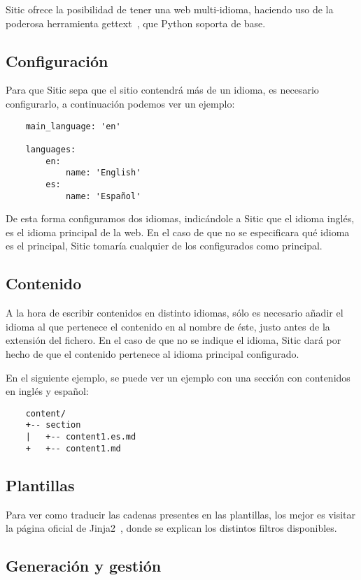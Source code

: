 Sitic ofrece la posibilidad de tener una web multi-idioma, haciendo uso de la poderosa herramienta
gettext~\cite{gettext}, que Python soporta de base.

\subsection{Configuración}

Para que Sitic sepa que el sitio contendrá más de un idioma, es necesario configurarlo, a continuación
podemos ver un ejemplo:

\begin{verbatim}
    main_language: 'en'

    languages:
        en:
            name: 'English'
        es:
            name: 'Español'
\end{verbatim}

De esta forma configuramos dos idiomas, indicándole a Sitic que el idioma inglés, es el idioma principal
de la web. En el caso de que no se especificara qué idioma es el principal, Sitic tomaría cualquier de
los configurados como principal.

\subsection{Contenido}

A la hora de escribir contenidos en distinto idiomas, sólo es necesario añadir el idioma al que pertenece el
contenido en al nombre de éste, justo antes de la extensión del fichero. En el caso de que no se indique el
idioma, Sitic dará por hecho de que el contenido pertenece al idioma principal configurado.

En el siguiente ejemplo, se puede ver un ejemplo con una sección con contenidos en inglés y español:

\begin{verbatim}
    content/
    +-- section
    |   +-- content1.es.md
    +   +-- content1.md
\end{verbatim}

\subsection{Plantillas}

Para ver como traducir las cadenas presentes en las plantillas, los mejor es visitar la página oficial de
Jinja2~\cite{jinja}, donde se explican los distintos filtros disponibles.

\subsection{Generación y gestión}

